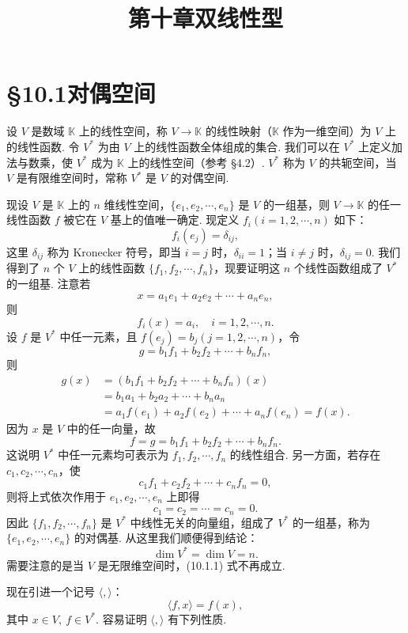 \documentclass[UTF8,12pt,a4paper,fontset=fandol]{ctexart}
\title{第十章\quad 双线性型}
\author{}
\date{}
\begin{document}
\maketitle

\section*{§10.1\quad 对偶空间}

设 $V$ 是数域 $\mathbb K$ 上的线性空间，称 $V\to \mathbb K$ 的线性映射（$\mathbb K$ 作为一维空间）为 $V$ 上的线性函数. 令 $V^*$ 为由 $V$ 上的线性函数全体组成的集合. 我们可以在 $V^*$ 上定义加法与数乘，使 $V^*$ 成为 $\mathbb K$ 上的线性空间（参考 §4.2）. $V^*$ 称为 $V$ 的共轭空间，当 $V$ 是有限维空间时，常称 $V^*$ 是 $V$ 的对偶空间.

现设 $V$ 是 $\mathbb K$ 上的 $n$ 维线性空间，$\{e_1,e_2,\cdots,e_n\}$ 是 $V$ 的一组基，则 $V\to \mathbb K$ 的任一线性函数 $f$ 被它在 $V$ 基上的值唯一确定. 现定义 $f_i(i=1,2,\cdots,n)$ 如下：
\[
  f_i(e_j)=\delta_{ij},
\]
这里 $\delta_{ij}$ 称为 Kronecker 符号，即当 $i=j$ 时，$\delta_{ii}=1$；当 $i\ne j$ 时，$\delta_{ij}=0$. 我们得到了 $n$ 个 $V$ 上的线性函数 $\{f_1,f_2,\cdots,f_n\}$，现要证明这 $n$ 个线性函数组成了 $V^*$ 的一组基. 注意若
\[
  x=a_1e_1+a_2e_2+\cdots+a_ne_n,
\]
则
\[
  f_i(x)=a_i,\quad i=1,2,\cdots,n.
\]
设 $f$ 是 $V^*$ 中任一元素，且 $f(e_j)=b_j(j=1,2,\cdots,n)$，令
\[
  g=b_1f_1+b_2f_2+\cdots+b_nf_n,
\]
则
\[
\begin{aligned}
  g(x)&=(b_1f_1+b_2f_2+\cdots+b_nf_n)(x)\\
      &=b_1a_1+b_2a_2+\cdots+b_na_n\\
      &=a_1f(e_1)+a_2f(e_2)+\cdots+a_nf(e_n)=f(x).
\end{aligned}
\]
因为 $x$ 是 $V$ 中的任一向量，故
\[
  f=g=b_1f_1+b_2f_2+\cdots+b_nf_n.
\]
这说明 $V^*$ 中任一元素均可表示为 $f_1,f_2,\cdots,f_n$ 的线性组合. 另一方面，若存在 $c_1,c_2,\cdots,c_n$，使
\[
  c_1f_1+c_2f_2+\cdots+c_nf_n=0,
\]
则将上式依次作用于 $e_1,e_2,\cdots,e_n$ 上即得
\[
  c_1=c_2=\cdots=c_n=0.
\]
因此 $\{f_1,f_2,\cdots,f_n\}$ 是 $V^*$ 中线性无关的向量组，组成了 $V^*$ 的一组基，称为 $\{e_1,e_2,\cdots,e_n\}$ 的对偶基. 从这里我们顺便得到结论：
\begin{equation}
  \dim V^*=\dim V=n.
  \tag{10.1.1}
\end{equation}
需要注意的是当 $V$ 是无限维空间时，(10.1.1) 式不再成立.

现在引进一个记号 $\langle,\rangle$：
\[
  \langle f,x\rangle=f(x),
\]
其中 $x\in V,\ f\in V^*$. 容易证明 $\langle,\rangle$ 有下列性质.
\end{document}
